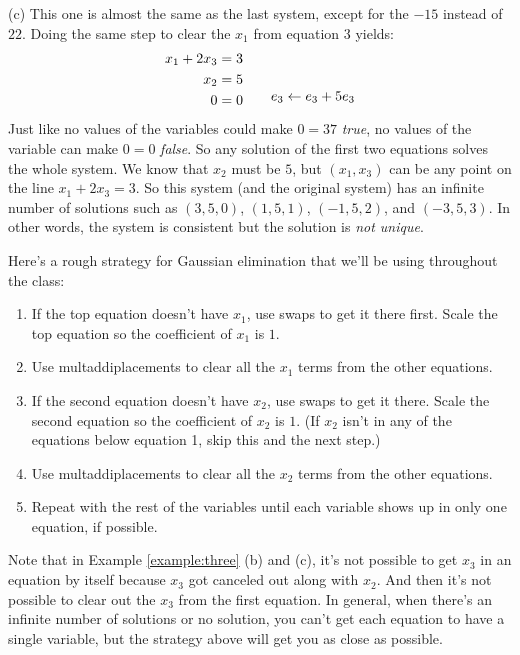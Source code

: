 \documentclass[11pt, letterpaper]{report}
\newenvironment{book}{}{}
\newcounter{example}[section]
\begin{document}
\begin{book}
(c) This one is almost the same as the last system, except for the $-15$ instead of $22$. Doing the same step to clear the $x_1$ from equation 3 yields:
\[
\begin{aligned}
x_1 + 2x_3 &= 3 \\
x_2 &= 5 \\
0 &= 0
\end{aligned} \quad \quad 
\begin{matrix}
\rule{1em}{0em}\\ \rule{1em}{0em} \\ e_3\leftarrow e_3+5e_3 
\end{matrix}
\]
Just like no values of the variables could make $0=37$ \emph{true}, no values of the variable can make $0=0$ \emph{false}. So any solution of the first two equations solves the whole system. We know that $x_2$ must be $5$, but $(x_1,x_3)$ can be any point on the line $x_1+2x_3=3$. So this system (and the original system) has an infinite number of solutions such as $(3,5,0)$, $(1,5,1)$, $(-1,5,2)$, and $(-3,5,3)$. In other words, the system is consistent but the solution is \emph{not unique}. \blacksquare
\end{book}

Here's a rough strategy for Gaussian elimination that we'll be using throughout the class:

\begin{enumerate}
\item {} If the top equation doesn't have $x_1$, use swaps to get it there first. Scale the top equation so the coefficient of $x_1$ is $1$. 
\item Use multaddiplacements to clear all the $x_1$ terms from the other equations.
\item If the second equation doesn't have $x_2$, use swaps to get it there. Scale the second equation so the coefficient of $x_2$ is $1$. (If $x_2$ isn't in any of the equations below equation 1, skip this and the next step.)
\item Use multaddiplacements to clear all the $x_2$ terms from the other equations.
\item Repeat with the rest of the variables until each variable shows up in only one equation, if possible.
\end{enumerate}

Note that in Example \ref{example:three} (b) and (c), it's not possible to get $x_3$ in an equation by itself because $x_3$ got canceled out along with $x_2$. And then it's not possible to clear out the $x_3$ from the first equation. In general, when there's an infinite number of solutions or no solution, you can't get each equation to have a single variable, but the strategy above will get you as close as possible.
\end{document}
